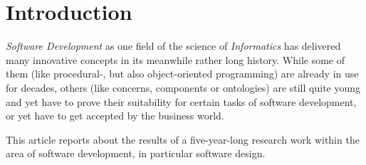 %
%
%
%
%
%
%

\section{Introduction}
\label{introduction_heading}

\emph{Software Development} as one field of the science of \emph{Informatics}
has delivered many innovative concepts in its meanwhile rather long history.
While some of them (like procedural-, but also object-oriented programming) are
already in use for decades, others (like concerns, components or ontologies)
are still quite young and yet have to prove their suitability for certain tasks
of software development, or yet have to get accepted by the business world.

This article reports about the results of a five-year-long research work within
the area of software development, in particular software design.






